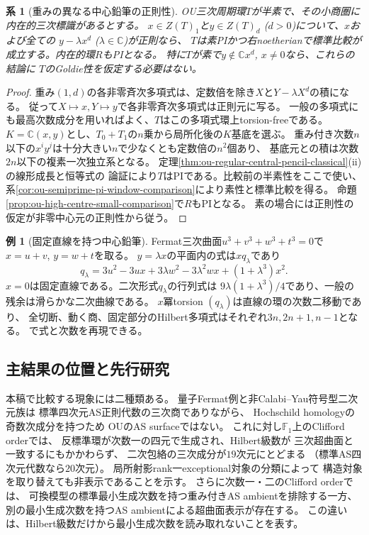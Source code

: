 \documentclass[11pt,a4paper]{ltjsarticle}
\newtheorem{corollary}[theorem]{系}
\theoremstyle{definition}
\newtheorem{example}[theorem]{例}
\begin{document}
\begin{corollary}[重みの異なる中心鉛筆の正則性]
\label{cor:ou-weighted-regular-centre}
OU三次周期環$T$が半素で、その小商圏に内在的三次標識があるとする。
$x\in Z(T)_1$と$y\in Z(T)_d$ ($d>0$)について、$x$および全ての
$y-\lambda x^d$ ($\lambda\in\mathbb C$)が正則なら、
$T$は素PIかつ右noetherianで標準比較が成立する。内在的環$R$もPIとなる。
特に$T$が素で$y\notin\mathbb C x^d$, $x\ne0$なら、これらの結論に
$T$のGoldie性を仮定する必要はない。
\end{corollary}
\begin{proof}
重み$(1,d)$の各非零斉次多項式は、定数倍を除き$X$と$Y-\lambda X^d$の積になる。
従って$X\mapsto x,Y\mapsto y$で各非零斉次多項式は正則元に写る。
一般の多項式にも最高次数成分を用いればよく、$T$はこの多項式環上torsion-freeである。
$K=\mathbb C(x,y)$とし、$T_0+T_1$の$n$乗から局所化後の$K$基底を選ぶ。
重み付き次数$n$以下の$x^iy^j$は十分大きい$n$で少なくとも定数倍の$n^2$個あり、
基底元との積は次数$2n$以下の複素一次独立系となる。
定理\ref{thm:ou-regular-central-pencil-classical}(ii)の線形成長と恒等式の
論証により$T$はPIである。比較前の半素性をここで使い、
系\ref{cor:ou-semiprime-pi-window-comparison}により素性と標準比較を得る。
命題\ref{prop:ou-high-centre-small-comparison}で$R$もPIとなる。
素の場合には正則性の仮定が非零中心元の正則性から従う。
\end{proof}

\begin{example}[固定直線を持つ中心鉛筆]
Fermat三次曲面$u^3+v^3+w^3+t^3=0$で$x=u+v$, $y=w+t$を取る。
$y=\lambda x$の平面内の式は$xq_\lambda$であり
\[
 q_\lambda=3u^2-3ux+3\lambda w^2-3\lambda^2 wx+(1+\lambda^3)x^2 .
\]
$x=0$は固定直線である。二次形式$q_\lambda$の行列式は
$9\lambda(1+\lambda^3)/4$であり、一般の残余は滑らかな二次曲線である。
$x$冪torsion $(q_\lambda)$は直線の環の次数二移動であり、
全切断、動く商、固定部分のHilbert多項式はそれぞれ$3n,2n+1,n-1$となる。
で式と次数を再現できる。
\end{example}






\subsection{主結果の位置と先行研究}

本稿で比較する現象には二種類ある。
量子Fermat例と非Calabi--Yau符号型二次元族は
標準四次元AS正則代数の三次商でありながら、
Hochschild homologyの奇数次成分を持つため
OUのAS surfaceではない。
これに対し$\mathbb F_1$上のClifford orderでは、
反標準環が次数一の四元で生成され、Hilbert級数が
三次超曲面と一致するにもかかわらず、
二次包絡の三次成分が$19$次元にとどまる
（標準AS四次元代数なら$20$次元）。
局所射影rank一exceptional対象の分類によって
構造対象を取り替えても非表示であることを示す。
さらに次数一・二のClifford orderでは、
可換模型の標準最小生成次数を持つ重み付きAS ambientを排除する一方、
別の最小生成次数を持つAS ambientによる超曲面表示が存在する。
この違いは、Hilbert級数だけから最小生成次数を読み取れないことを表す。
\end{document}
